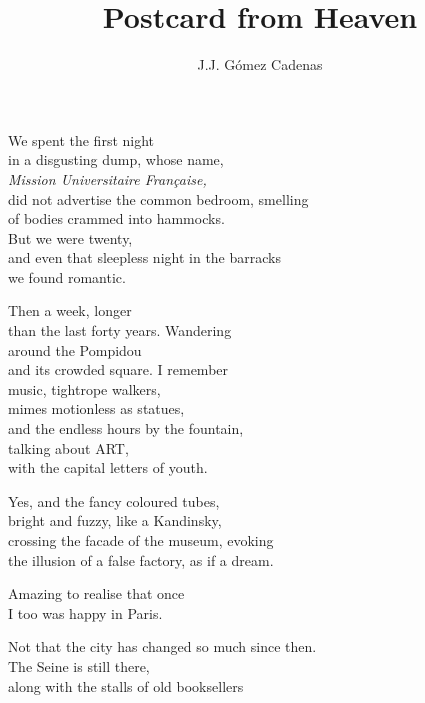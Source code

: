 \documentclass[12pt,twoside]{article}
\title{Postcard from Heaven}
\author{J.J. Gómez Cadenas}
\newcounter{scounter}
\newcommand\step{\stepcounter{scounter}\Roman{scounter}}
\begin{document}
\maketitle

\poemtitle{\step} 
\begin{poem}
\begin{stanza} 
We spent the first night\\
in a disgusting dump, whose name,\\
{\em Mission Universitaire Française,}\\
did not advertise the common bedroom, smelling\\
of bodies crammed into hammocks.\\
But we were twenty,\\
and even that sleepless night in the barracks\\
we found romantic.
\end{stanza}
\begin{stanza} 
Then a week, longer \\
than the last forty years. Wandering\\
around the Pompidou\\
and its crowded square. I remember\\
music, tightrope walkers,\\ 
mimes motionless as statues,\\ 
and the endless hours by the fountain,\\
talking about ART,\\
with the capital letters of youth.
\end{stanza}
\begin{stanza}
Yes, and the fancy coloured tubes,\\
bright and fuzzy, like a Kandinsky,\\
crossing the facade of the museum, evoking\\
the illusion of a false factory, as if a dream.
\end{stanza}
\begin{stanza}
Amazing to realise that once\\
I too was happy in Paris.
\end{stanza}
\begin{stanza}
Not that the city has changed so much since then.\\
The Seine is still there,\\
along with the stalls of old booksellers\\

\end{stanza}
\end{poem}
\end{document}
